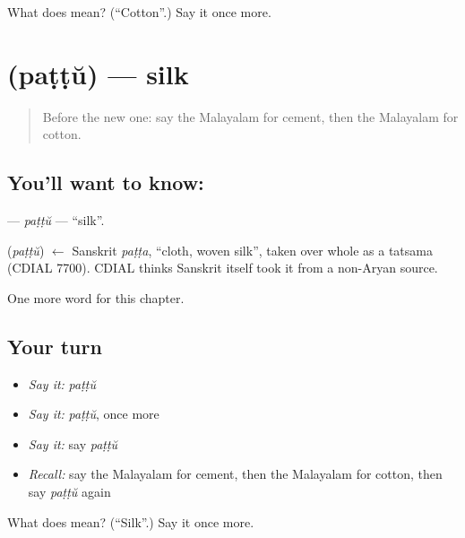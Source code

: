 \begin{tcolorbox}[breakable,colback=teal!4,colframe=teal!35!black,title={Before you move on}]
What does  mean? (\textquotedblleft{}Cotton\textquotedblright{}.) Say it once more.
\end{tcolorbox}
\section[\texorpdfstring{\ml{പട്ട്} (paṭṭŭ)}{പട്ട് (paṭṭŭ)}]{ (paṭṭŭ) — silk}

\label{lesson:ML-C217-pattu}



\begin{quote}
Before the new one: say the Malayalam for cement, then the Malayalam for cotton.
\end{quote}

\subsection*{You'll want to know: }
\textbf{} — \emph{paṭṭŭ} — \textquotedblleft{}silk\textquotedblright{}.

\begin{cousinweb}
\textbf{} (\emph{paṭṭŭ}) $\leftarrow$ Sanskrit \emph{paṭṭa}, \textquotedblleft{}cloth, woven silk\textquotedblright{}, taken over whole as a tatsama (CDIAL 7700). CDIAL thinks Sanskrit itself took it from a non-Aryan source.
\end{cousinweb}

\begin{grammarlens}[title={What you've built}]
One more word for this chapter.
\end{grammarlens}

\subsection*{Your turn}
\begin{itemize}
\raggedright
  \item \emph{Say it:} \emph{paṭṭŭ}
  \item \emph{Say it:} \emph{paṭṭŭ}, once more
  \item \emph{Say it:} say \emph{paṭṭŭ}
  \item \emph{Recall:} say the Malayalam for cement, then the Malayalam for cotton, then say \emph{paṭṭŭ} again
\end{itemize}

\begin{tcolorbox}[breakable,colback=teal!4,colframe=teal!35!black,title={Before you move on}]
What does  mean? (\textquotedblleft{}Silk\textquotedblright{}.) Say it once more.
\end{tcolorbox}
